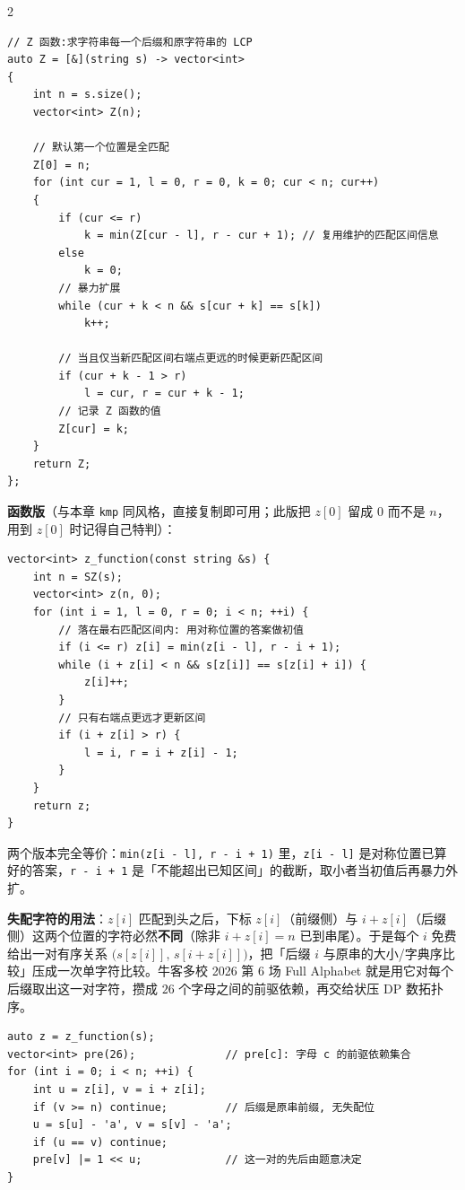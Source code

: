 \begin{multicols*}{2}
		\begin{verbatim}
// Z 函数:求字符串每一个后缀和原字符串的 LCP
auto Z = [&](string s) -> vector<int>
{
	int n = s.size();
	vector<int> Z(n);

	// 默认第一个位置是全匹配
	Z[0] = n;
	for (int cur = 1, l = 0, r = 0, k = 0; cur < n; cur++)
	{
		if (cur <= r)
			k = min(Z[cur - l], r - cur + 1); // 复用维护的匹配区间信息
		else
			k = 0;
		// 暴力扩展
		while (cur + k < n && s[cur + k] == s[k])
			k++;

		// 当且仅当新匹配区间右端点更远的时候更新匹配区间
		if (cur + k - 1 > r)
			l = cur, r = cur + k - 1;
		// 记录 Z 函数的值
		Z[cur] = k;
	}
	return Z;
};
		\end{verbatim}

		\textbf{函数版}（与本章 \texttt{kmp} 同风格，直接复制即可用；此版把 $z[0]$ 留成 $0$ 而不是 $n$，用到 $z[0]$ 时记得自己特判）：

		\begin{verbatim}
vector<int> z_function(const string &s) {
	int n = SZ(s);
	vector<int> z(n, 0);
	for (int i = 1, l = 0, r = 0; i < n; ++i) {
		// 落在最右匹配区间内: 用对称位置的答案做初值
		if (i <= r) z[i] = min(z[i - l], r - i + 1);
		while (i + z[i] < n && s[z[i]] == s[z[i] + i]) {
			z[i]++;
		}
		// 只有右端点更远才更新区间
		if (i + z[i] > r) {
			l = i, r = i + z[i] - 1;
		}
	}
	return z;
}
		\end{verbatim}

		两个版本完全等价：\texttt{min(z[i - l], r - i + 1)} 里，\texttt{z[i - l]} 是对称位置已算好的答案，\texttt{r - i + 1} 是「不能超出已知区间」的截断，取小者当初值后再暴力外扩。

		\textbf{失配字符的用法}：$z[i]$ 匹配到头之后，下标 $z[i]$（前缀侧）与 $i + z[i]$（后缀侧）这两个位置的字符必然\textbf{不同}（除非 $i + z[i] = n$ 已到串尾）。于是每个 $i$ 免费给出一对有序关系 $\big(s[z[i]],\, s[i + z[i]]\big)$，把「后缀 $i$ 与原串的大小/字典序比较」压成一次单字符比较。牛客多校 2026 第 6 场 Full Alphabet 就是用它对每个后缀取出这一对字符，攒成 $26$ 个字母之间的前驱依赖，再交给状压 DP 数拓扑序。

		\begin{verbatim}
auto z = z_function(s);
vector<int> pre(26);              // pre[c]: 字母 c 的前驱依赖集合
for (int i = 0; i < n; ++i) {
	int u = z[i], v = i + z[i];
	if (v >= n) continue;         // 后缀是原串前缀, 无失配位
	u = s[u] - 'a', v = s[v] - 'a';
	if (u == v) continue;
	pre[v] |= 1 << u;             // 这一对的先后由题意决定
}
		\end{verbatim}


\end{multicols*}
